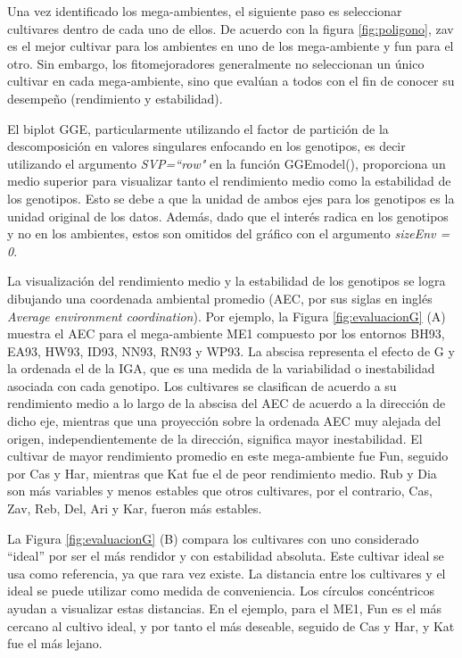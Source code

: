 Una vez identificado los mega-ambientes, el siguiente paso es seleccionar cultivares dentro de cada uno de ellos. De acuerdo con la figura  \ref{fig:poligono}, zav es el mejor cultivar para los ambientes en uno de los mega-ambiente y fun para el otro. Sin embargo, los fitomejoradores generalmente no seleccionan un único cultivar en cada mega-ambiente, sino que evalúan a todos con el fin de conocer su desempeño (rendimiento y estabilidad).  

El biplot GGE, particularmente utilizando el factor de partición de la descomposición en valores singulares enfocando en los genotipos, es decir utilizando el argumento \emph{SVP=``row"} en la función \textcolor{fandango}{GGEmodel()}, proporciona un medio superior para visualizar tanto el rendimiento medio como la estabilidad de los genotipos. Esto se debe a que la unidad de ambos ejes para los genotipos es la unidad original de los datos. Además, dado que el interés radica en los genotipos y no en los ambientes, estos son omitidos del gráfico con el argumento \emph{sizeEnv = 0}.

La visualización del rendimiento medio y la estabilidad de los genotipos se logra dibujando una coordenada ambiental promedio (AEC, por sus siglas en inglés \emph{Average environment coordination}). Por ejemplo, la Figura \ref{fig:evaluacionG} (A)  muestra el AEC para el mega-ambiente ME1 compuesto por los entornos BH93, EA93, HW93, ID93, NN93, RN93 y WP93. La abscisa representa el efecto de G y la ordenada el de la IGA, que es una medida de la variabilidad o inestabilidad asociada con cada genotipo. Los cultivares se clasifican de acuerdo a su rendimiento medio a lo largo de la abscisa del AEC de acuerdo a la dirección de dicho eje, mientras que una proyección sobre la ordenada AEC muy alejada del origen, independientemente de la dirección, significa mayor inestabilidad. El cultivar de mayor rendimiento promedio en este mega-ambiente fue Fun, seguido por Cas y Har, mientras que Kat fue el de peor rendimiento medio. Rub y Dia son más variables y menos estables que otros cultivares, por el contrario, Cas, Zav, Reb, Del, Ari y Kar, fueron más estables. 

La Figura \ref{fig:evaluacionG} (B) compara los cultivares con uno considerado ``ideal” por ser el más rendidor y con estabilidad absoluta. Este cultivar ideal se usa como referencia, ya que rara vez existe. La distancia entre los cultivares y el ideal se puede utilizar como medida de conveniencia. Los círculos concéntricos ayudan a visualizar estas distancias. En el ejemplo, para el ME1, Fun es el más cercano al cultivo ideal, y por tanto el más deseable, seguido de Cas y Har, y Kat fue el más lejano. \\


